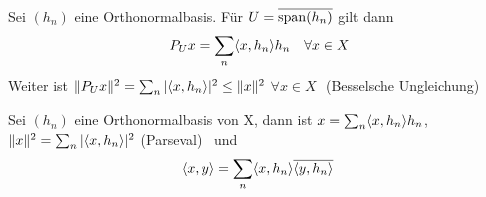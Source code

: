 \begin{satz} \label{satz:16.7}
	Sei $(h_{n})$ eine Orthonormalbasis. Für $U = \overline{\operatorname{span}(h_{n})}$ gilt dann
		\[ P_{U} x = \sum_{n} \langle x, h_{n} \rangle h_{n} \quad \forall x \in X \]
	Weiter ist $\| P_{U} x \|^{2} = \sum_{n} | \langle x , h_{n} \rangle |^{2} \leq \| x \|^{2}$ $\forall x \in X$ $ $ (Besselsche Ungleichung) 
\end{satz}


\begin{kor} \label{kor:16.8}
	Sei $(h_{n})$ eine Orthonormalbasis von X, dann ist $x = \sum_{n} \langle x, h_{n} \rangle h_{n}$, $\| x \|^{2} = \sum_{n} | \langle x, h_{n} \rangle |^{2}$ (Parseval)  und
		\[ \< x , y \> = \sum_{n} \< x, h_{n} \> \overline{\< y , h_{n} \>} \]
\end{kor}


